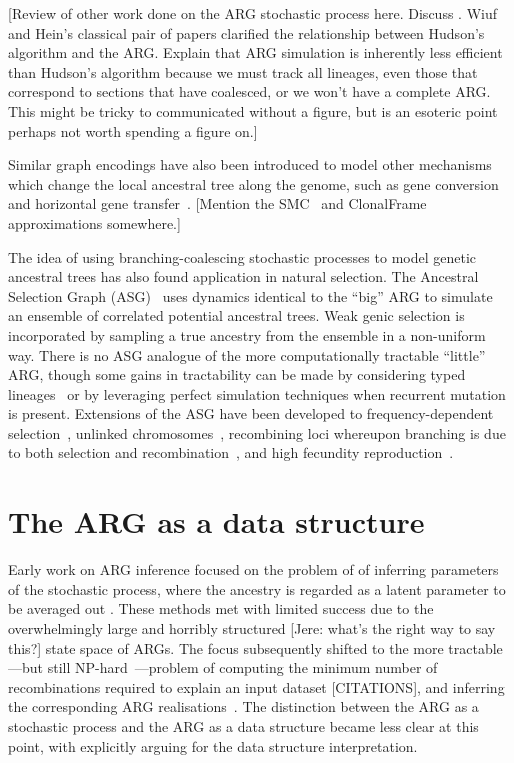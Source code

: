 \documentclass{article}
\begin{document}
[Review of other work done on the ARG stochastic process here.
Discuss \citet{wiuf1999ancestry}. Wiuf and Hein's classical pair of papers
clarified the relationship between Hudson's algorithm and the ARG.
Explain that ARG simulation is inherently less efficient than Hudson's
algorithm because we must track all lineages, even those that correspond
to sections that have coalesced, or we won't have a complete ARG.
This might be tricky to communicated without a figure, but is an
esoteric point perhaps not worth spending a figure on.]

Similar graph encodings have also been introduced to model other mechanisms
which change the local ancestral tree along the genome, such as gene
conversion~\citep{wiuf2000coalescent} and
horizontal gene transfer~\citep{baumdicker2014infinitely}.
[Mention the
SMC~\citep{mcvean2005approximating,marjoram2006fast}
and ClonalFrame~\citep{didelot2007inference} approximations somewhere.]

The idea of using branching-coalescing stochastic processes
to model genetic ancestral trees has also found application in natural selection.
The Ancestral Selection Graph (ASG)~\citep{krone1997ancestral,neuhauser1997genealogy}
uses dynamics identical to the ``big'' ARG to simulate an ensemble of correlated
potential ancestral trees. Weak genic selection is incorporated by sampling a
true ancestry from the ensemble in a non-uniform way.
There is no ASG analogue of the more computationally tractable ``little'' ARG,
though some gains in tractability can be made by considering typed
lineages~\citep{etheridge2009coalescent} or by leveraging perfect simulation
techniques when recurrent mutation is present\citep{fearnhead2001perfect}.
Extensions of the ASG have been developed to frequency-dependent
selection~\citep{neuhauser1999ancestral, gonzalezcasanova2018duality},
unlinked chromosomes~\citep{fearnhead2003ancestral}, recombining
loci whereupon branching is due to both selection and
recombination~\citep{donnelly1999genealogical}, and high fecundity
reproduction~\citep{gonzalezcasanova2018duality, koskela2019robust}.

\section*{The ARG as a data structure}
Early work on ARG inference focused on the problem of
of inferring parameters of the
stochastic process, where the ancestry is regarded as a
latent parameter to be averaged out
\citep[e.g.][]{griffiths1996ancestral,kuhner2000maximum, nielsen2000estimation,
fearnhead2001estimating}. These methods met with limited success
due to the overwhelmingly large and
horribly structured [Jere: what's the right way to say this?]
state space of ARGs. The focus subsequently shifted to
the more tractable---but still
NP-hard~\citep{wang2001perfect}---problem of computing
the minimum number of recombinations required
to explain an input dataset [CITATIONS], and inferring the corresponding
ARG realisations~\citep{song2003parsimonious,song2005efficient,lyngso2005minimum}.
The distinction between the ARG as a stochastic process
and the ARG as a data structure became less clear at this point,
with \citet{minichiello2006mapping} explicitly arguing for
the data structure interpretation.
\end{document}
